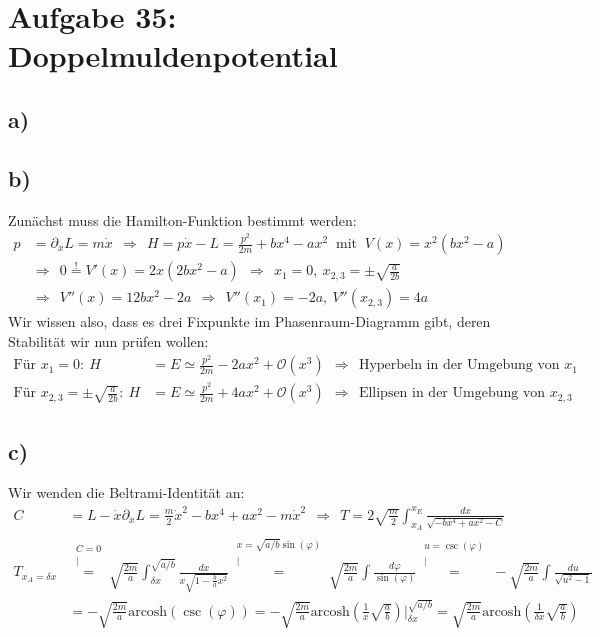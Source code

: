 \documentclass[a4paper,12pt]{article}
\begin{document}
\section*{Aufgabe 35: Doppelmuldenpotential}
\subsection*{a)}
\subsection*{b)} Zunächst muss die Hamilton-Funktion bestimmt werden:
\begin{align*}
p&=\partial_{\dot{x}}L=m\dot{x}\ \ \Rightarrow\ \ H=p\dot{x}-L=\frac{p^2}{2m}+bx^4-ax^2\ \textrm{ mit }\ V(x)=x^2(bx^2-a) \\
&\Rightarrow\ \ 0\overset{!}{=}V'(x)=2x(2bx^2-a)\ \ \Rightarrow\ \ x_1=0,\ x_{2,3}=\pm\sqrt{\frac{a}{2b}}\\
&\Rightarrow\ \ V''(x)=12bx^2-2a\ \ \Rightarrow\ \ V''(x_1)=-2a,\ V''(x_{2,3})=4a
\end{align*}
Wir wissen also, dass es drei Fixpunkte im Phasenraum-Diagramm gibt, deren Stabilität wir nun prüfen wollen:
\begin{align*}
\textrm{Für } x_1=0:\ H&=E\simeq \frac{p^2}{2m}-2ax^2+\mathcal{O}(x^3)\ \ \Rightarrow\ \ \textrm{Hyperbeln in der Umgebung von }x_1\\
\textrm{Für } x_{2,3}=\pm\sqrt{\frac{a}{2b}}:\ H&=E\simeq \frac{p^2}{2m}+4ax^2+\mathcal{O}(x^3)\ \ \Rightarrow\ \ \textrm{Ellipsen in der Umgebung von }x_{2,3}
\end{align*}
\subsection*{c)} Wir wenden die Beltrami-Identität an:
\begin{align*}
C&=L-\dot{x}\partial_{\dot{x}}L=\frac{m}{2}\dot{x}^2-bx^4+ax^2-m\dot{x}^2\ \ \Rightarrow\ \ T=2\sqrt{\frac{m}{2}}\int_{x_A}^{x_E}\frac{dx}{\sqrt{-bx^4+ax^2-C}}\\
T_{x_A=\delta x}&\overset{\substack{C=0\\|}}{=}\sqrt{\frac{2m}{a}}\int_{\delta x}^{\sqrt{a/b}}\frac{dx}{x\sqrt{1-\frac{b}{a}x^2}}\overset{\substack{x=\sqrt{a/b}\sin(\varphi)\\|}}{=}\sqrt{\frac{2m}{a}}\int\frac{d\varphi}{\sin(\varphi)}\overset{\substack{u=\csc(\varphi)\\|}}{=}-\sqrt{\frac{2m}{a}}\int \frac{du}{\sqrt{u^2-1}}\\
&=-\sqrt{\frac{2m}{a}}\textrm{arcosh}(\csc(\varphi))=-\sqrt{\frac{2m}{a}}\textrm{arcosh}(\frac{1}{x}\sqrt{\frac{a}{b}})\bigg\vert_{\delta x}^{\sqrt{a/b}}=\sqrt{\frac{2m}{a}}\textrm{arcosh}(\frac{1}{\delta x}\sqrt{\frac{a}{b}})
\end{align*}
\end{document}
